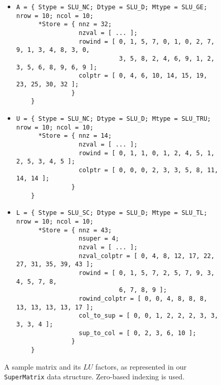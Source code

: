 \begin{figure}[tbp]
\begin{itemize}
\item \begin{verbatim}
A = { Stype = SLU_NC; Dtype = SLU_D; Mtype = SLU_GE; nrow = 10; ncol = 10;
      *Store = { nnz = 32;
                 nzval = [ ... ];
                 rowind = [ 0, 1, 5, 7, 0, 1, 0, 2, 7, 9, 1, 3, 4, 8, 3, 0,
                            3, 5, 8, 2, 4, 6, 9, 1, 2, 3, 5, 6, 8, 9, 6, 9 ];
                 colptr = [ 0, 4, 6, 10, 14, 15, 19, 23, 25, 30, 32 ];
               }
    }
      \end{verbatim}
\item \begin{verbatim}
U = { Stype = SLU_NC; Dtype = SLU_D; Mtype = SLU_TRU; nrow = 10; ncol = 10;
      *Store = { nnz = 14;
                 nzval = [ ... ];
                 rowind = [ 0, 1, 1, 0, 1, 2, 4, 5, 1, 2, 5, 3, 4, 5 ];
                 colptr = [ 0, 0, 0, 2, 3, 3, 5, 8, 11, 14, 14 ];
               }
    }
      \end{verbatim}
\item \begin{verbatim}
L = { Stype = SLU_SC; Dtype = SLU_D; Mtype = SLU_TL; nrow = 10; ncol = 10;
      *Store = { nnz = 43;
                 nsuper = 4;
                 nzval = [ ... ];
                 nzval_colptr = [ 0, 4, 8, 12, 17, 22, 27, 31, 35, 39, 43 ];
                 rowind = [ 0, 1, 5, 7, 2, 5, 7, 9, 3, 4, 5, 7, 8, 
                            6, 7, 8, 9 ];
                 rowind_colptr = [ 0, 0, 4, 8, 8, 8, 13, 13, 13, 13, 17 ];
                 col_to_sup = [ 0, 0, 1, 2, 2, 2, 3, 3, 3, 3, 4 ];
                 sup_to_col = [ 0, 2, 3, 6, 10 ];
               }
    }
      \end{verbatim}
\end{itemize}
\caption{A sample matrix and its $LU$ factors, as represented in our 
        {\tt SuperMatrix} data structure. Zero-based indexing is used.}
  \label{fig:matrixeg}
\end{figure}

